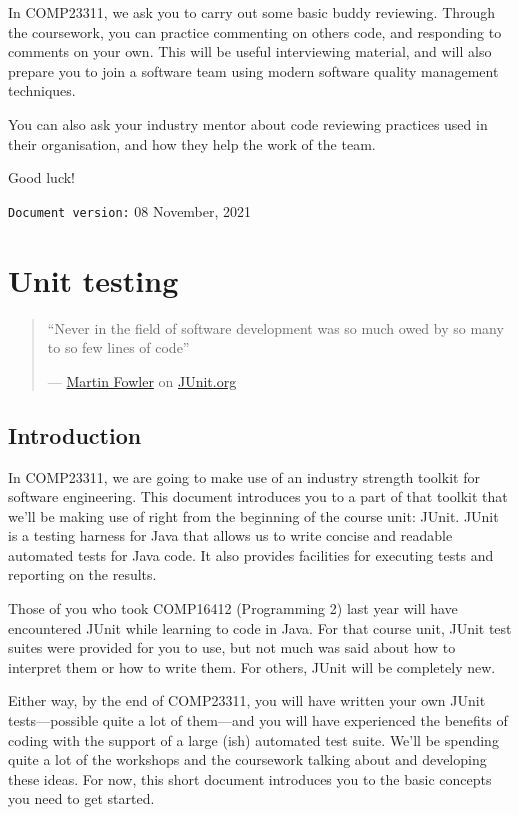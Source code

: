 \documentclass[
]{book}
\begin{document}
In COMP23311, we ask you to carry out some basic buddy reviewing. Through the coursework, you can practice commenting on others code, and responding to comments on your own. This will be useful interviewing material, and will also prepare you to join a software team using modern software quality management techniques.

You can also ask your industry mentor about code reviewing practices used in their organisation, and how they help the work of the team.

Good luck!

\texttt{Document\ version:} 08 November, 2021

\hypertarget{automating}{%
\chapter{Unit testing}\label{automating}}

\begin{quote}
``Never in the field of software development was so much owed by so many to so few lines of code''

--- \href{https://en.wikipedia.org/wiki/Martin_Fowler_(software_engineer)}{Martin Fowler} on \href{https://junit.org/}{JUnit.org}
\end{quote}

\hypertarget{jintro}{%
\section{Introduction}\label{jintro}}

In COMP23311, we are going to make use of an industry strength toolkit for software engineering. This document introduces you to a part of that toolkit that we'll be making use of right from the beginning of the course unit: JUnit. JUnit is a testing harness for Java that allows us to write concise and readable automated tests for Java code. It also provides facilities for executing tests and reporting on the results.

Those of you who took COMP16412 (Programming 2) last year will have encountered JUnit while learning to code in Java. For that course unit, JUnit test suites were provided for you to use, but not much was said about how to interpret them or how to write them. For others, JUnit will be completely new.

Either way, by the end of COMP23311, you will have written your own JUnit tests---possible quite a lot of them---and you will have experienced the benefits of coding with the support of a large (ish) automated test suite. We'll be spending quite a lot of the workshops and the coursework talking about and developing these ideas. For now, this short document introduces you to the basic concepts you need to get started.
\end{document}
